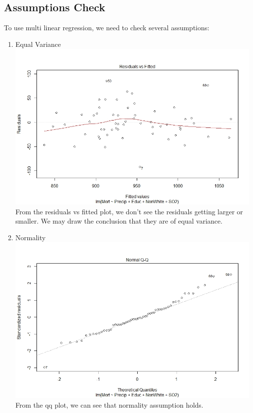 \documentclass[12pt,a4paper]{article}
\begin{document}
\subsection{Assumptions Check}
To use multi linear regression, we need to check several assumptions:
\begin{enumerate}
\item{Equal Variance}~{}
\newline
\includegraphics[scale=0.6]{ev.jpeg}
\newline
From the residuals vs fitted plot, we don't see the residuals getting larger or smaller. We may draw the conclusion that they are of equal variance.\\
\item{Normality}~{}
\newline
\includegraphics[scale=0.6]{qq.jpeg}
\newline
From the qq plot, we can see that normality assumption holds.\\

\end{enumerate}
\end{document}
